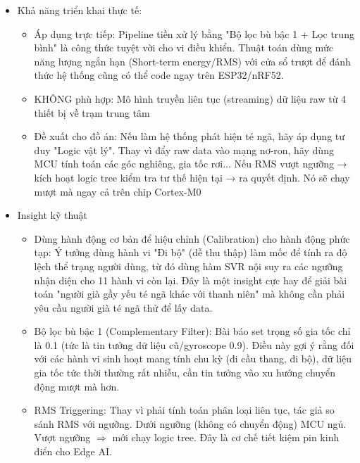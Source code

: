 \documentclass[../DoAn.tex]{subfiles}
\begin{document}
\begin{enumerate}[label=\arabic*)]
\begin{itemize}
\begin{itemize}
        \end{itemize}
        \item Khả năng triển khai thực tế:
        \begin{itemize}
            \item Áp dụng trực tiếp: Pipeline tiền xử lý bằng "Bộ lọc bù bậc 1 + Lọc trung bình" là công thức tuyệt vời cho vi điều khiển. Thuật toán dùng mức năng lượng ngắn hạn (Short-term energy/RMS) với cửa sổ trượt để đánh thức hệ thống cũng có thể code ngay trên ESP32/nRF52.
            \item KHÔNG phù hợp: Mô hình truyền liên tục (streaming) dữ liệu raw từ 4 thiết bị về trạm trung tâm
            \item Đề xuất cho đồ án: Nếu làm hệ thống phát hiện té ngã, hãy áp dụng tư duy "Logic vật lý". Thay vì đẩy raw data vào mạng nơ-ron, hãy dùng MCU tính toán các góc nghiêng, gia tốc rơi... Nếu RMS vượt ngưỡng → kích hoạt logic tree kiểm tra tư thế hiện tại → ra quyết định. Nó sẽ chạy mượt mà ngay cả trên chip Cortex-M0
        \end{itemize}
        \item Insight kỹ thuật
        \begin{itemize}
            \item Dùng hành động cơ bản để hiệu chỉnh (Calibration) cho hành động phức tạp: Ý tưởng dùng hành vi "Đi bộ" (dễ thu thập) làm mốc để tính ra độ lệch thể trạng người dùng, từ đó dùng hàm SVR nội suy ra các ngưỡng nhận diện cho 11 hành vi còn lại. Đây là một insight cực hay để giải bài toán "người già gầy yếu té ngã khác với thanh niên" mà không cần phải yêu cầu người già té ngã thử để lấy data.
            \item Bộ lọc bù bậc 1 (Complementary Filter): Bài báo set trọng số gia tốc chỉ là 0.1 (tức là tin tưởng dữ liệu cũ/gyroscope 0.9). Điều này gợi ý rằng đối với các hành vi sinh hoạt mang tính chu kỳ (đi cầu thang, đi bộ), dữ liệu gia tốc tức thời thường rất nhiễu, cần tin tưởng vào xu hướng chuyển động mượt mà hơn.
            \item RMS Triggering: Thay vì phải tính toán phân loại liên tục, tác giả so sánh RMS với ngưỡng. Dưới ngưỡng (không có chuyển động)  MCU ngủ. Vượt ngưỡng $\Longrightarrow$ mới chạy logic tree. Đây là cơ chế tiết kiệm pin kinh điển cho Edge AI.
        \end{itemize}
    \end{itemize}
\end{enumerate}
\end{document}
